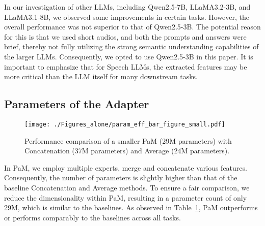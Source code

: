 In our investigation of other LLMs, including Qwen2.5-7B, LLaMA3.2-3B, and LLaMA3.1-8B, we observed some improvements in certain tasks. However, the overall performance was not superior to that of Qwen2.5-3B. The potential reason for this is that we used short audios, and both the prompts and answers were brief, thereby not fully utilizing the strong semantic understanding capabilities of the larger LLMs. Consequently, we opted to use Qwen2.5-3B in this paper. It is important to emphasize that for Speech LLMs, the extracted features may be more critical than the LLM itself for many downstream tasks.

\subsection{Parameters of the Adapter}

\begin{figure}[tp]
  \centering
  \centerline{\texttt{[image: ./Figures\_alone/param\_eff\_bar\_figure\_small.pdf]}}  
  \caption{Performance comparison of a smaller PaM (29M parameters) with Concatenation (37M parameters) and Average (24M parameters).}
\label{fig:small}
\end{figure}

In PaM, we employ multiple experts, merge and concatenate various features. Consequently, the number of parameters is slightly higher than that of the baseline Concatenation and Average methods. To ensure a fair comparison, we reduce the dimensionality within PaM, resulting in a parameter count of only 29M, which is similar to the baselines. As observed in Table~\ref{fig:small}, PaM outperforms or performs comparably to the baselines across all tasks.

